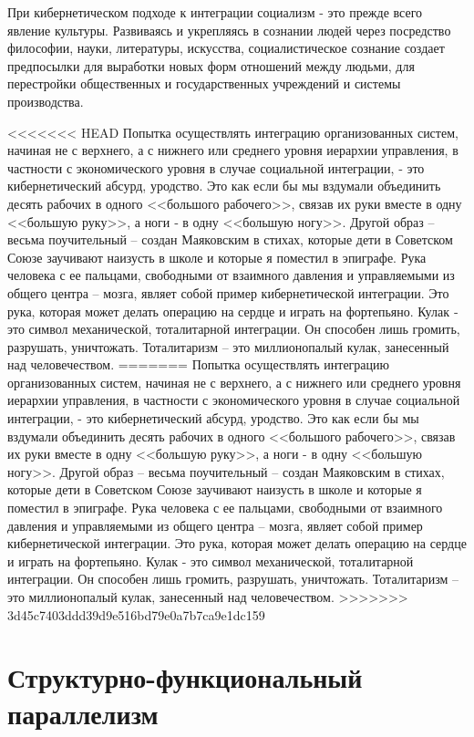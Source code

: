 \documentclass{book}
\begin{document}
При кибернетическом подходе к интеграции социализм - это прежде всего явление культуры.  Развиваясь и укрепляясь в сознании людей через посредство философии, науки, литера­туры, искусства, социалистическое сознание создает предпосыл­ки для выработки новых форм отношений между людьми, для перестройки общественных и государственных учреждений и системы производства.

<<<<<<< HEAD
Попытка осуществлять интеграцию организованных систем, начиная не с верхнего, а с нижнего или среднего уровня иерар­хии управления, в частности с экономического уровня в случае социальной интеграции, ‑ это кибернетический абсурд, уродство. Это как если бы мы вздумали объединить десять ра­бочих в одного <<большого рабочего>>, связав их руки вместе в одну <<большую руку>>, а ноги ‑ в одну <<большую ногу>>. Другой образ -- весьма поучительный -- создан Маяковским в стихах, которые дети в Советском Союзе заучивают наизусть в школе и которые я поместил в эпиграфе. Рука человека с ее пальцами, свободными от взаимного давления и управляемыми из общего центра -- мозга, являет собой пример кибернетиче­ской интеграции. Это рука, которая может делать операцию на сердце и играть на фортепьяно. Кулак ‑ это символ механи­ческой, тоталитарной интеграции. Он способен лишь громить, разрушать, уничтожать. Тоталитаризм -- это миллионопалый кулак, занесенный над человечеством.
=======
Попытка осуществлять интеграцию организованных систем, начиная не с верхнего, а с нижнего или среднего уровня иерар­хии управления, в частности с экономического уровня в случае социальной интеграции, - это кибернетический абсурд, уродство. Это как если бы мы вздумали объединить десять ра­бочих в одного <<большого рабочего>>, связав их руки вместе в одну <<большую руку>>, а ноги - в одну <<большую ногу>>. Другой образ -- весьма поучительный -- создан Маяковским в стихах, которые дети в Советском Союзе заучивают наизусть в школе и которые я поместил в эпиграфе. Рука человека с ее пальцами, свободными от взаимного давления и управляемыми из общего центра -- мозга, являет собой пример кибернетиче­ской интеграции. Это рука, которая может делать операцию на сердце и играть на фортепьяно. Кулак - это символ механи­ческой, тоталитарной интеграции. Он способен лишь громить, разрушать, уничтожать. Тоталитаризм -- это миллионопалый кулак, занесенный над человечеством.
>>>>>>> 3d45c7403ddd39d9e516bd79e0a7b7ca9e1dc159


\section{Структурно-функциональный параллелизм}
\end{document}
